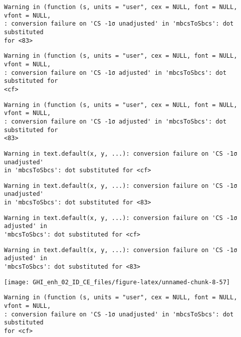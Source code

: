 \documentclass[
  10pt,
  a4paper,oneside]{article}
\begin{document}
\begin{verbatim}
Warning in (function (s, units = "user", cex = NULL, font = NULL, vfont = NULL,
: conversion failure on 'CS -1σ unadjusted' in 'mbcsToSbcs': dot substituted
for <83>
\end{verbatim}

\begin{verbatim}
Warning in (function (s, units = "user", cex = NULL, font = NULL, vfont = NULL,
: conversion failure on 'CS -1σ adjusted' in 'mbcsToSbcs': dot substituted for
<cf>
\end{verbatim}

\begin{verbatim}
Warning in (function (s, units = "user", cex = NULL, font = NULL, vfont = NULL,
: conversion failure on 'CS -1σ adjusted' in 'mbcsToSbcs': dot substituted for
<83>
\end{verbatim}

\begin{verbatim}
Warning in text.default(x, y, ...): conversion failure on 'CS -1σ unadjusted'
in 'mbcsToSbcs': dot substituted for <cf>
\end{verbatim}

\begin{verbatim}
Warning in text.default(x, y, ...): conversion failure on 'CS -1σ unadjusted'
in 'mbcsToSbcs': dot substituted for <83>
\end{verbatim}

\begin{verbatim}
Warning in text.default(x, y, ...): conversion failure on 'CS -1σ adjusted' in
'mbcsToSbcs': dot substituted for <cf>
\end{verbatim}

\begin{verbatim}
Warning in text.default(x, y, ...): conversion failure on 'CS -1σ adjusted' in
'mbcsToSbcs': dot substituted for <83>
\end{verbatim}

\begin{center}\texttt{[image: GHI\_enh\_02\_ID\_CE\_files/figure-latex/unnamed-chunk-8-57]} \end{center}

\begin{verbatim}
Warning in (function (s, units = "user", cex = NULL, font = NULL, vfont = NULL,
: conversion failure on 'CS -1σ unadjusted' in 'mbcsToSbcs': dot substituted
for <cf>
\end{verbatim}
\end{document}
